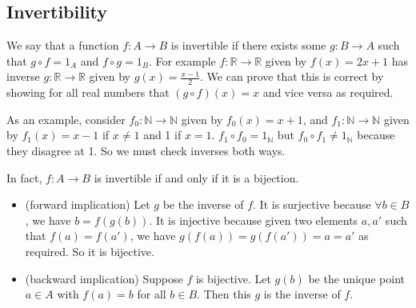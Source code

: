 \subsection{Invertibility}
We say that a function \(f\colon A \to B\) is invertible if there exists some \(g\colon B \to A\) such that \(g \circ f = 1_A\) and \(f \circ g = 1_B\).
For example \(f\colon \mathbb R \to \mathbb R\) given by \(f(x)=2x+1\) has inverse \(g\colon \mathbb R \to \mathbb R\) given by \(g(x)=\frac{x-1}{2}\).
We can prove that this is correct by showing for all real numbers that \((g\circ f)(x) = x\) and vice versa as required.

As an example, consider \(f_0\colon \mathbb N \to \mathbb N\) given by \(f_0(x)=x+1\), and \(f_1\colon \mathbb N \to \mathbb N\) given by \(f_1(x) = x-1\) if \(x\neq 1\) and 1 if \(x=1\).
\(f_1\circ f_0 = 1_{\mathbb N}\) but \(f_0\circ f_1 \neq 1_{\mathbb N}\) because they disagree at 1.
So we must check inverses both ways.

In fact, \(f\colon A \to B\) is invertible if and only if it is a bijection.
\begin{itemize}
	\item (forward implication) Let \(g\) be the inverse of \(f\).
	      It is surjective because \(\forall b \in B\), we have \(b=f(g(b))\).
	      It is injective because given two elements \(a,a'\) such that \(f(a) = f(a')\), we have \(g(f(a)) = g(f(a')) = a = a'\) as required.
	      So it is bijective.
	\item (backward implication) Suppose \(f\) is bijective.
		  Let \(g(b)\) be the unique point \(a \in A\) with \(f(a) = b\) for all \(b \in B\).
		  Then this \(g\) is the inverse of \(f\).
\end{itemize}

